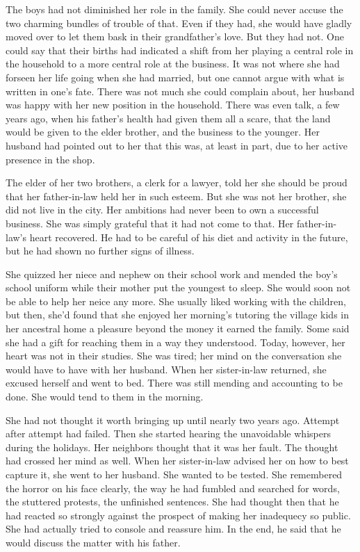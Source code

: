 \documentclass{article}
\begin{document}
The boys had not diminished her role in the family. She could never accuse the two charming bundles of trouble of that. Even if they had, she would have  gladly moved over to let them bask in their grandfather's love. But they had not. One could say that their births had indicated a shift from her playing a central role in the household to a more central role at the business. It was not where she had forseen her life going when she had married, but one cannot argue with what is written in one's fate. There was not much she could complain about, her husband was happy with her new position in the household. There was even talk, a few years ago, when his father's health had given them all a scare, that the land would be given to the elder brother, and the business to the younger. Her husband had pointed out to her that this was, at least in part, due to her active presence in the shop. 

The elder of her two brothers, a clerk for a lawyer, told her she should be proud that her father-in-law held her in such esteem. But she was not her brother, she did not live in the city. Her ambitions had never been to own a successful business. She was simply grateful that it had not come to that. Her father-in-law's heart recovered. He had to be careful of his diet and activity in the future, but he had shown no further signs of illness.

She quizzed her niece and nephew on their school work and mended the boy's school uniform while their mother put the youngest to sleep. She would soon not be able to help her neice any more. She usually liked working with the children, but then, she'd found that she enjoyed her morning's tutoring the village kids in her ancestral home a pleasure beyond the money it earned the family. Some said she had a gift for reaching them in a way they understood. Today, however, her heart was not in their studies. She was tired; her mind on the conversation she would have to have with her husband. When her sister-in-law returned, she excused herself and went to bed. There was still mending and accounting to be done. She would tend to them in the morning.

She had not thought it worth bringing up until nearly two years ago. Attempt after attempt had failed. Then she started hearing the unavoidable whispers during the holidays. Her neighbors thought that it was her fault. The thought had crossed her mind as well. When her sister-in-law advised her on how to best capture it, she went to her husband. She wanted to be tested. She remembered the horror on his face clearly, the way he had fumbled and searched for words, the stuttered protests, the unfinished sentences. She had thought then that he had reacted so strongly against the prospect of making her inadequecy so public. She had actually tried to console and reassure him. In the end, he said that he would discuss the matter with his father. 
\end{document}
